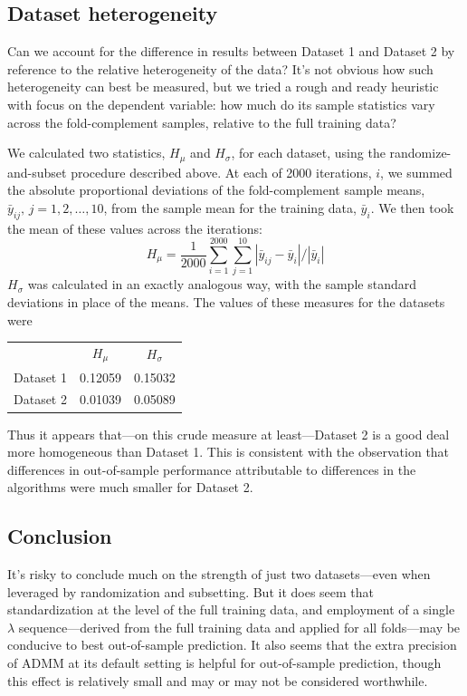 \documentclass{article}
\begin{document}
\subsection{Dataset heterogeneity}

Can we account for the difference in results between Dataset 1 and
Dataset 2 by reference to the relative heterogeneity of the data?
It's not obvious how such heterogeneity can best be measured, but we
tried a rough and ready heuristic with focus on the dependent
variable: how much do its sample statistics vary across the
fold-complement samples, relative to the full training data?

We calculated two statistics, $H_\mu$ and $H_\sigma$, for each
dataset, using the randomize-and-subset procedure described above.  At
each of 2000 iterations, $i$, we summed the absolute proportional
deviations of the fold-complement sample means,
$\bar{y}_{ij},\, j=1,2,\dots,10$, from the sample mean for the
training data, $\bar{y}_i$. We then took the mean of these values
across the iterations:
\[
  H_\mu = \frac{1}{2000} \sum_{i=1}^{2000} \sum_{j=1}^{10} |\bar{y}_{ij} - \bar{y}_i|/|\bar{y}_i|
\]
$H_\sigma$ was calculated in an exactly analogous way, with the sample
standard deviations in place of the means.  The values of these
measures for the datasets were
\begin{center}
  \begin{tabular}{lcc}
    & $H_\mu$ & $H_\sigma$ \\
    Dataset 1 & 0.12059 & 0.15032 \\
    Dataset 2 & 0.01039 & 0.05089
  \end{tabular}
\end{center}
Thus it appears that---on this crude measure at least---Dataset 2 is a
good deal more homogeneous than Dataset 1. This is consistent with the
observation that differences in out-of-sample performance attributable
to differences in the algorithms were much smaller for Dataset 2.

\subsection{Conclusion}

It's risky to conclude much on the strength of just two
datasets---even when leveraged by randomization and subsetting. But it
does seem that standardization at the level of the full training data,
and employment of a single $\lambda$ sequence---derived from the full
training data and applied for all folds---may be conducive to best
out-of-sample prediction. It also seems that the extra precision of
ADMM at its default setting is helpful for out-of-sample prediction,
though this effect is relatively small and may or may not be
considered worthwhile.
\end{document}
